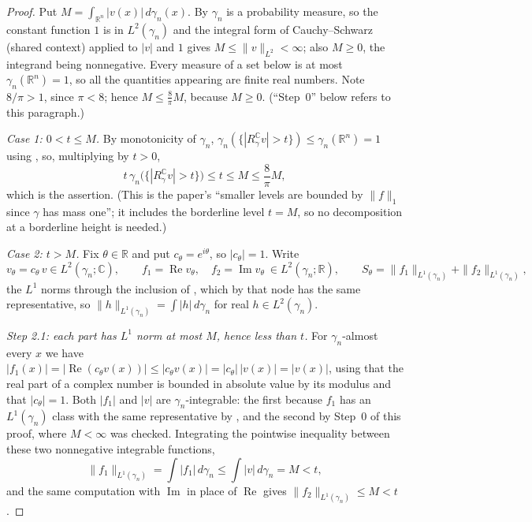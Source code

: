 \begin{proof}
Put $M = \int_{\mathbb{R}^n}|v(x)|\,d\gamma_n(x)$.  By 
$\gamma_n$ is a probability measure, so the constant function $1$ is in
$L^2(\gamma_n)$ and the integral form of Cauchy--Schwarz (shared context)
applied to $|v|$ and $1$ gives $M \leq \|v\|_{L^2} < \infty$; also $M \geq 0$,
the integrand being nonnegative.  Every measure of a set below is at most
$\gamma_n(\mathbb{R}^n) = 1$, so all the quantities appearing are finite real
numbers.  Note $8/\pi > 1$, since $\pi < 8$; hence $M \leq \frac{8}{\pi}M$,
because $M \geq 0$.  (``Step~0'' below refers to this paragraph.)

\emph{Case 1: $0 < t \leq M$.}
By monotonicity of $\gamma_n$,
$\gamma_n(\{|R_\gamma^{\mathbb{C}} v| > t\}) \leq \gamma_n(\mathbb{R}^n) = 1$
using , so, multiplying by $t > 0$,
\[
  t\,\gamma_n\bigl(\{|R_\gamma^{\mathbb{C}} v| > t\}\bigr)
    \leq t \leq M \leq \frac{8}{\pi}M ,
\]
which is the assertion.  (This is the paper's ``smaller levels are bounded by
$\|f\|_1$ since $\gamma$ has mass one''; it includes the borderline level
$t = M$, so no decomposition at a borderline height is needed.)

\emph{Case 2: $t > M$.}  Fix $\theta \in \mathbb{R}$ and put $c_\theta = e^{i\theta}$,
so $|c_\theta| = 1$.  Write
\[
  v_\theta = c_\theta\,v \in L^2(\gamma_n;\mathbb{C}),
  \qquad
  f_1 = \operatorname{Re} v_\theta, \quad f_2 = \operatorname{Im} v_\theta
  \ \in L^2(\gamma_n;\mathbb{R}),
  \qquad
  S_\theta = \|f_1\|_{L^1(\gamma_n)} + \|f_2\|_{L^1(\gamma_n)} ,
\]
the $L^1$ norms through the inclusion of , which by that node has
the same representative, so $\|h\|_{L^1(\gamma_n)} = \int|h|\,d\gamma_n$ for
real $h \in L^2(\gamma_n)$.

\emph{Step 2.1: each part has $L^1$ norm at most $M$, hence less than $t$.}
For $\gamma_n$-almost every $x$ we have
$|f_1(x)| = |\operatorname{Re}(c_\theta v(x))| \leq |c_\theta v(x)|
 = |c_\theta|\,|v(x)| = |v(x)|$, using that the real part of a complex number is
bounded in absolute value by its modulus and that $|c_\theta| = 1$.  Both
$|f_1|$ and $|v|$ are $\gamma_n$-integrable: the first because $f_1$ has an
$L^1(\gamma_n)$ class with the same representative by , and the
second by Step~0 of this proof, where $M < \infty$ was checked.  Integrating the
pointwise inequality between these two nonnegative integrable functions,
\[
  \|f_1\|_{L^1(\gamma_n)} = \int |f_1| \, d\gamma_n
    \leq \int |v| \, d\gamma_n = M < t ,
\]
and the same computation with $\operatorname{Im}$ in place of $\operatorname{Re}$
gives $\|f_2\|_{L^1(\gamma_n)} \leq M < t$.


\end{proof}
